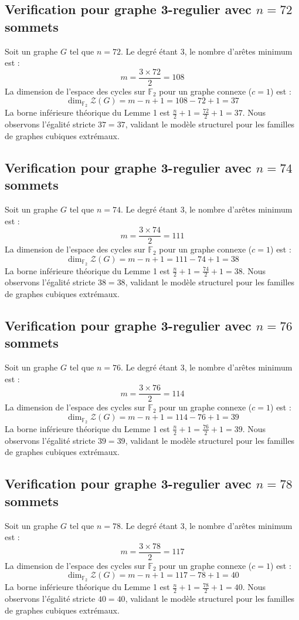 \documentclass[11pt,a4paper]{article}
\begin{document}
\subsection{Verification pour graphe 3-regulier avec $n=72$ sommets}
Soit un graphe $G$ tel que $n = 72$. Le degré étant 3, le nombre d'arêtes minimum est :
$$ m = \frac{3 \times 72}{2} = 108 $$
La dimension de l'espace des cycles sur $\mathbb{F}_2$ pour un graphe connexe ($c=1$) est :
$$ \dim_{\mathbb{F}_2} \mathcal{Z}(G) = m - n + 1 = 108 - 72 + 1 = 37 $$
La borne inférieure théorique du Lemme 1 est $\frac{n}{2} + 1 = \frac{72}{2} + 1 = 37$.
Nous observons l'égalité stricte $37 = 37$, validant le modèle structurel pour les familles de graphes cubiques extrémaux.

\subsection{Verification pour graphe 3-regulier avec $n=74$ sommets}
Soit un graphe $G$ tel que $n = 74$. Le degré étant 3, le nombre d'arêtes minimum est :
$$ m = \frac{3 \times 74}{2} = 111 $$
La dimension de l'espace des cycles sur $\mathbb{F}_2$ pour un graphe connexe ($c=1$) est :
$$ \dim_{\mathbb{F}_2} \mathcal{Z}(G) = m - n + 1 = 111 - 74 + 1 = 38 $$
La borne inférieure théorique du Lemme 1 est $\frac{n}{2} + 1 = \frac{74}{2} + 1 = 38$.
Nous observons l'égalité stricte $38 = 38$, validant le modèle structurel pour les familles de graphes cubiques extrémaux.

\subsection{Verification pour graphe 3-regulier avec $n=76$ sommets}
Soit un graphe $G$ tel que $n = 76$. Le degré étant 3, le nombre d'arêtes minimum est :
$$ m = \frac{3 \times 76}{2} = 114 $$
La dimension de l'espace des cycles sur $\mathbb{F}_2$ pour un graphe connexe ($c=1$) est :
$$ \dim_{\mathbb{F}_2} \mathcal{Z}(G) = m - n + 1 = 114 - 76 + 1 = 39 $$
La borne inférieure théorique du Lemme 1 est $\frac{n}{2} + 1 = \frac{76}{2} + 1 = 39$.
Nous observons l'égalité stricte $39 = 39$, validant le modèle structurel pour les familles de graphes cubiques extrémaux.

\subsection{Verification pour graphe 3-regulier avec $n=78$ sommets}
Soit un graphe $G$ tel que $n = 78$. Le degré étant 3, le nombre d'arêtes minimum est :
$$ m = \frac{3 \times 78}{2} = 117 $$
La dimension de l'espace des cycles sur $\mathbb{F}_2$ pour un graphe connexe ($c=1$) est :
$$ \dim_{\mathbb{F}_2} \mathcal{Z}(G) = m - n + 1 = 117 - 78 + 1 = 40 $$
La borne inférieure théorique du Lemme 1 est $\frac{n}{2} + 1 = \frac{78}{2} + 1 = 40$.
Nous observons l'égalité stricte $40 = 40$, validant le modèle structurel pour les familles de graphes cubiques extrémaux.
\end{document}
